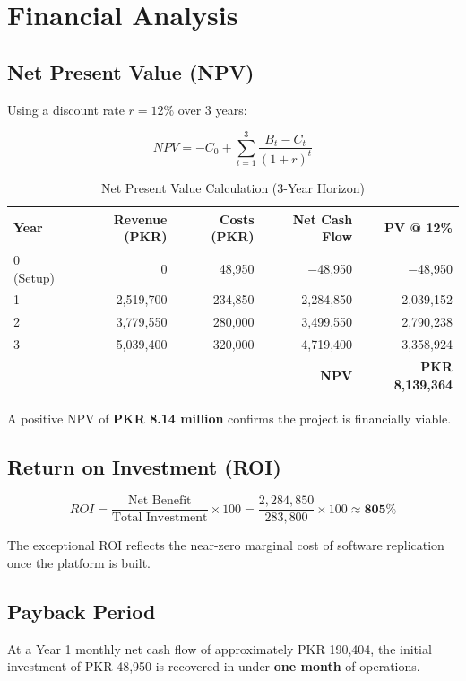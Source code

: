 \documentclass[12pt,a4paper]{report}
\begin{document}
\section{Financial Analysis}

\subsection*{Net Present Value (NPV)}

Using a discount rate $r = 12\%$ over 3 years:

\[
NPV = -C_0 + \sum_{t=1}^{3} \frac{B_t - C_t}{(1+r)^t}
\]

\begin{table}[H]
\centering
\begin{tabular}{l r r r r}
\toprule
\textbf{Year} & \textbf{Revenue (PKR)} & \textbf{Costs (PKR)} & \textbf{Net Cash Flow} & \textbf{PV @ 12\%} \\
\midrule
0 (Setup)   & 0           & 48,950      & $-$48,950      & $-$48,950    \\
1           & 2,519,700   & 234,850     & 2,284,850      & 2,039,152    \\
2           & 3,779,550   & 280,000     & 3,499,550      & 2,790,238    \\
3           & 5,039,400   & 320,000     & 4,719,400      & 3,358,924    \\
\midrule
\multicolumn{4}{r}{\textbf{NPV}} & \textbf{PKR 8,139,364} \\
\bottomrule
\end{tabular}
\caption{Net Present Value Calculation (3-Year Horizon)}
\end{table}

A positive NPV of \textbf{PKR 8.14 million} confirms the project is financially viable.

\subsection*{Return on Investment (ROI)}

\[
ROI = \frac{\text{Net Benefit}}{\text{Total Investment}} \times 100
= \frac{2{,}284{,}850}{283{,}800} \times 100 \approx \mathbf{805\%}
\]

The exceptional ROI reflects the near-zero marginal cost of software replication once the platform is built.

\subsection*{Payback Period}
At a Year 1 monthly net cash flow of approximately PKR 190,404, the initial investment of PKR 48,950 is recovered in under \textbf{one month} of operations.
\end{document}
